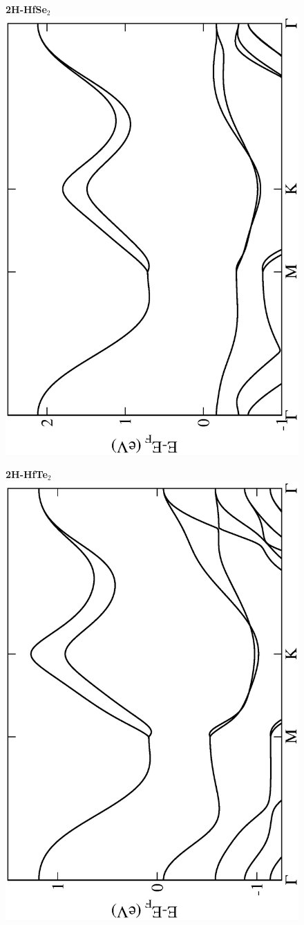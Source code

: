 \begin{figure}[htbp]
\centering
{\bfseries \sffamily 2H-HfSe$_{2}$}\\
\includegraphics[width=0.45\linewidth, angle=-90, trim={2.9cm, 0cm, 2cm, 0cm}, clip]{img/SI_figs/BS/2H-HfSe2.eps}
\end{figure}

\begin{figure}[htbp]
\centering
{\bfseries \sffamily 2H-HfTe$_{2}$}\\
\includegraphics[width=0.45\linewidth, angle=-90, trim={2.9cm, 0cm, 2cm, 0cm}, clip]{img/SI_figs/BS/2H-HfTe2.eps}
\end{figure}

